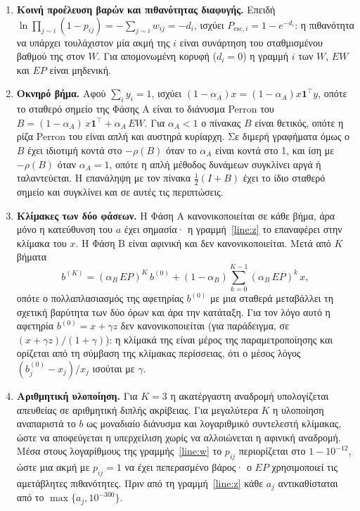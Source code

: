 \documentclass[11pt,a4paper]{article}
\newcommand{\one}{\mathbf{1}}
\newcommand{\KB}{3}
\begin{document}
\begin{enumerate}[leftmargin=1.5em,itemsep=3pt]
\item \textbf{Κοινή προέλευση βαρών και πιθανότητας διαφυγής.} Επειδή $\ln\prod_{j\sim i}(1-p_{ij})=-\sum_{j\sim i}w_{ij}=-d_i$, ισχύει $P_{\mathrm{esc},i}=1-e^{-d_i}$: η πιθανότητα να υπάρχει τουλάχιστον μία ακμή της $i$ είναι συνάρτηση του σταθμισμένου βαθμού της στον $W$. Για απομονωμένη κορυφή ($d_i=0$) η γραμμή $i$ των $W$, $EW$ και $EP$ είναι μηδενική.

\item \textbf{Οκνηρό βήμα.} Αφού $\sum_i y_i=1$, ισχύει $(1-\alpha_A)x=(1-\alpha_A)x\one^{\top}y$, οπότε το σταθερό σημείο της Φάσης Α είναι το διάνυσμα Perron του $B=(1-\alpha_A)\,x\one^{\top}+\alpha_A\,EW$. Για $\alpha_A<1$ ο πίνακας $B$ είναι θετικός, οπότε η ρίζα Perron του είναι απλή και αυστηρά κυρίαρχη. Σε διμερή γραφήματα όμως ο $B$ έχει ιδιοτιμή κοντά στο $-\rho(B)$ όταν το $\alpha_A$ είναι κοντά στο 1, και ίση με $-\rho(B)$ όταν $\alpha_A=1$, οπότε η απλή μέθοδος δυνάμεων συγκλίνει αργά ή ταλαντεύεται. Η επανάληψη με τον πίνακα $\tfrac12(I+B)$ έχει το ίδιο σταθερό σημείο και συγκλίνει και σε αυτές τις περιπτώσεις.

\item \textbf{Κλίμακες των δύο φάσεων.} Η Φάση Α κανονικοποιείται σε κάθε βήμα, άρα μόνο η κατεύθυνση του $a$ έχει σημασία· η γραμμή~\ref{line:z} το επαναφέρει στην κλίμακα του $x$. Η Φάση Β είναι αφινική και δεν κανονικοποιείται. Μετά από $K$ βήματα
\[
b^{(K)}=(\alpha_B\,EP)^{K}\,b^{(0)}+(1-\alpha_B)\sum_{k=0}^{K-1}(\alpha_B\,EP)^{k}\,x ,
\]
οπότε ο πολλαπλασιασμός της αφετηρίας $b^{(0)}$ με μια σταθερά μεταβάλλει τη σχετική βαρύτητα των δύο όρων και άρα την κατάταξη. Για τον λόγο αυτό η αφετηρία $b^{(0)}=x+\gamma z$ δεν κανονικοποιείται (για παράδειγμα, σε $(x+\gamma z)/(1+\gamma)$): η κλίμακά της είναι μέρος της παραμετροποίησης και ορίζεται από τη σύμβαση της κλίμακας περίσσειας, ότι ο μέσος λόγος $(b^{(0)}_j-x_j)/x_j$ ισούται με $\gamma$.

\item \textbf{Αριθμητική υλοποίηση.} Για $K=\KB$ η ακατέργαστη αναδρομή υπολογίζεται απευθείας σε αριθμητική διπλής ακρίβειας. Για μεγαλύτερα $K$ η υλοποίηση αναπαριστά το $b$ ως μοναδιαίο διάνυσμα και λογαριθμικό συντελεστή κλίμακας, ώστε να αποφεύγεται η υπερχείλιση χωρίς να αλλοιώνεται η αφινική αναδρομή. Μέσα στους λογαρίθμους της γραμμής~\ref{line:w} το $p_{ij}$ περιορίζεται στο $1-10^{-12}$, ώστε μια ακμή με $p_{ij}=1$ να έχει πεπερασμένο βάρος· ο $EP$ χρησιμοποιεί τις αμετάβλητες πιθανότητες. Πριν από τη γραμμή~\ref{line:z} κάθε $a_j$ αντικαθίσταται από το $\max\{a_j,10^{-300}\}$.


\end{enumerate}
\end{document}
